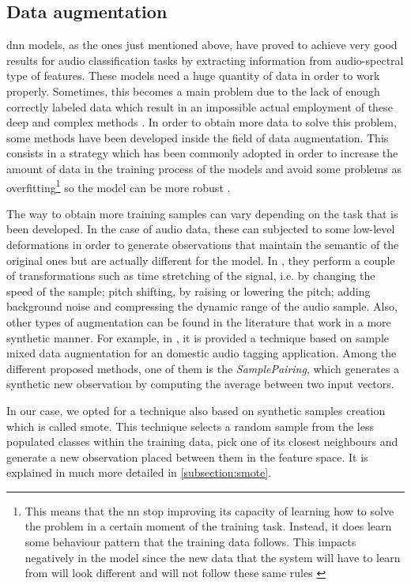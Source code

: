 \subsection{Data augmentation}
\label{subsection:data-augmentation}

	\acrlong{dnn} models, as the ones just mentioned above, have proved to achieve very good results for audio classification tasks by extracting information from audio-spectral type of features. These models need a huge quantity of data in order to work properly. Sometimes, this becomes a main problem due to the lack of enough correctly labeled data which result in an impossible actual employment of these deep and complex methods \cite{Salamon2017}. In order to obtain more data to solve this problem, some methods have been developed inside the field of data augmentation. This consists in a strategy which has been commonly adopted in order to increase the amount of data in the training process of the models and avoid some problems as overfitting\footnote{This means that the \acrshort{nn} stop improving its capacity of learning how to solve the problem in a certain moment of the training task. Instead, it does learn some behaviour pattern that the training data follows. This impacts negatively in the model since the new data that the system will have to learn from will look different and will not follow these same rules \cite{Jabbar2015}} so the model can be more robust \cite{Ko2015}.
	
	The way to obtain more training samples can vary depending on the task that is been developed. In the case of audio data, these can subjected to some low-level deformations in order to generate observations that maintain the semantic of the original ones but are actually different for the model. In \cite{Salamon2017a}, they perform a couple of transformations such as time stretching of the signal, i.e. by changing the speed of the sample; pitch shifting, by raising or lowering the pitch; adding background noise and compressing the dynamic range of the audio sample. Also, other types of augmentation can be found in the literature that work in a more synthetic manner. For example, in \cite{Wei2018}, it is provided a technique based on sample mixed data augmentation for an domestic audio tagging application. Among the different proposed methods, one of them is the \textit{SamplePairing}, which generates a synthetic new observation by computing the average between two input vectors.
	
	In our case, we opted for a technique also based on synthetic samples creation which is called \acrfull{smote}. This technique selects a random sample from the less populated classes within the training data, pick one of its closest neighbours and generate a new observation placed between them in the feature space. It is explained in much more detailed in \ref{subsection:smote}.
	
